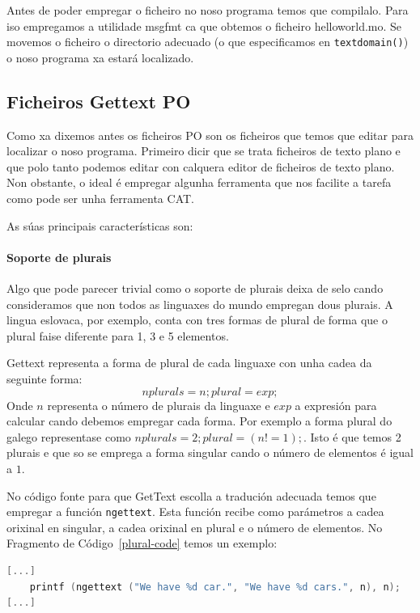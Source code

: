 Antes de poder empregar o ficheiro no noso programa temos que compilalo. Para iso empregamos a utilidade msgfmt ca que obtemos o ficheiro helloworld.mo. Se movemos o ficheiro o directorio adecuado (o que especificamos en \lstinline{textdomain()}) o noso programa xa estará localizado.

\subsection{Ficheiros Gettext PO}
Como xa dixemos antes os ficheiros PO son os ficheiros que temos que editar para localizar o noso programa. Primeiro dicir que se trata ficheiros de texto plano e que polo tanto podemos editar con calquera editor de ficheiros de texto plano. Non obstante, o ideal é empregar algunha ferramenta que nos facilite a tarefa como pode ser unha ferramenta CAT.

As súas principais características son:

\paragraph{Soporte de plurais}
Algo que pode parecer trivial como o soporte de plurais deixa de selo cando consideramos que non todos as linguaxes do mundo empregan dous plurais. A lingua eslovaca, por exemplo, conta con tres formas de plural de forma que o plural faise diferente para 1, 3 e 5 elementos.

Gettext representa a forma de plural de cada linguaxe con unha cadea da seguinte forma: $$nplurals=n; plural=exp;$$ Onde $n$ representa o número de plurais da linguaxe e $exp$ a expresión para calcular cando debemos empregar cada forma. Por exemplo a forma plural do galego representase como $nplurals=2; plural=(n != 1);$. Isto é que temos 2 plurais e que so se emprega a forma singular cando o número de elementos é igual a $1$.

No código fonte para que GetText escolla a tradución adecuada temos que empregar a función \lstinline{ngettext}. Esta función recibe como parámetros a cadea orixinal en singular, a cadea orixinal en plural e o número de elementos. No Fragmento de Código~\ref{plural-code} temos un exemplo:

\begin{lstlisting}[label=plural-code,language=C,caption=Plurais en GetText (Código Fonte).]
[...]
    printf (ngettext ("We have %d car.", "We have %d cars.", n), n);
[...]
\end{lstlisting}

